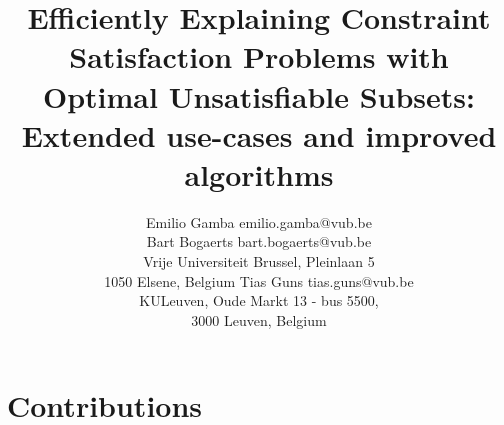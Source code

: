 \documentclass[twoside,11pt]{article}
\begin{document}
	

\title{Efficiently Explaining Constraint Satisfaction Problems with Optimal Unsatisfiable Subsets: Extended use-cases and improved algorithms}

\author{\name Emilio Gamba \email emilio.gamba@vub.be \\
\name Bart Bogaerts \email bart.bogaerts@vub.be \\
\addr Vrije Universiteit Brussel, Pleinlaan 5\\
1050 Elsene, Belgium
\AND
\name Tias Guns \email tias.guns@vub.be \\
\addr KULeuven, Oude Markt 13 - bus 5500,\\
3000 Leuven, Belgium
}

\researchnote

\maketitle
\section*{Contributions}
\label{sec:introduction}
\end{document}
